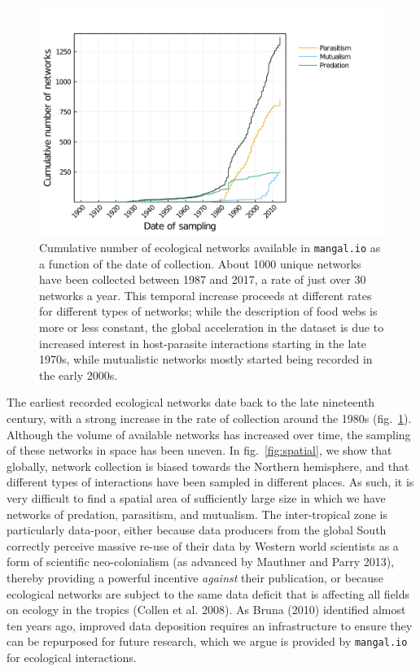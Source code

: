 \documentclass[10pt,oneside]{article}
\makeatletter
\def\maxwidth{\ifdim\Gin@nat@width>\linewidth\linewidth
\else\Gin@nat@width\fi}
\let\Oldincludegraphics\includegraphics
\renewcommand{\includegraphics}[1]{\Oldincludegraphics[width=\maxwidth]{#1}}
\makeatother
\begin{document}
\begin{figure}
\hypertarget{fig:temporal}{%
\centering
\includegraphics{figures/network_growth_over_time.png}
\caption{Cumulative number of ecological networks available in
\texttt{mangal.io} as a function of the date of collection. About 1000
unique networks have been collected between 1987 and 2017, a rate of
just over 30 networks a year. This temporal increase proceeds at
different rates for different types of networks; while the description
of food webs is more or less constant, the global acceleration in the
dataset is due to increased interest in host-parasite interactions
starting in the late 1970s, while mutualistic networks mostly started
being recorded in the early 2000s.}\label{fig:temporal}
}
\end{figure}

The earliest recorded ecological networks date back to the late
nineteenth century, with a strong increase in the rate of collection
around the 1980s (fig.~\ref{fig:temporal}). Although the volume of
available networks has increased over time, the sampling of these
networks in space has been uneven. In fig.~\ref{fig:spatial}, we show
that globally, network collection is biased towards the Northern
hemisphere, and that different types of interactions have been sampled
in different places. As such, it is very difficult to find a spatial
area of sufficiently large size in which we have networks of predation,
parasitism, and mutualism. The inter-tropical zone is particularly
data-poor, either because data producers from the global South correctly
perceive massive re-use of their data by Western world scientists as a
form of scientific neo-colonialism (as advanced by Mauthner and Parry
2013), thereby providing a powerful incentive \emph{against} their
publication, or because ecological networks are subject to the same data
deficit that is affecting all fields on ecology in the tropics (Collen
et al. 2008). As Bruna (2010) identified almost ten years ago, improved
data deposition requires an infrastructure to ensure they can be
repurposed for future research, which we argue is provided by
\texttt{mangal.io} for ecological interactions.
\end{document}
